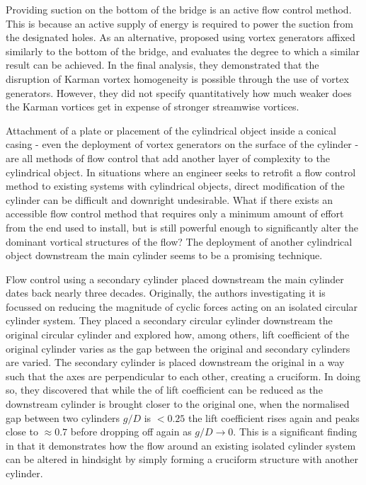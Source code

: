 \documentclass[oneside]{utmthesis}
\begin{document}
Providing suction on the bottom of the bridge is an active flow control method. This is because an active supply of energy is required to power the suction from the designated holes. As an alternative, \citet{Zhang2019} proposed using vortex generators affixed similarly to the bottom of the bridge, and evaluates the degree to which a similar result can be achieved. In the final analysis, they demonstrated that the disruption of Karman vortex homogeneity is possible through the use of vortex generators. However, they did not specify quantitatively how much weaker does the Karman vortices get in expense of stronger streamwise vortices.

Attachment of a plate \citep{Gibeau2019} or placement of the cylindrical object inside a conical casing \citep{Lin2018} - even the deployment of vortex generators on the surface of the cylinder \citep{Zhang2019} - are all methods of flow control that add another layer of complexity to the cylindrical object. In situations where an engineer seeks to retrofit a flow control method to existing systems with cylindrical objects, direct modification of the cylinder can be difficult and downright undesirable. What if there exists an accessible flow control method that requires only a minimum amount of effort from the end used to install, but is still powerful enough to significantly alter the dominant vortical structures of the flow? The deployment of another cylindrical object downstream the main cylinder seems to be a promising technique.

Flow control using a secondary cylinder placed downstream the main cylinder dates back nearly three decades. Originally, the authors investigating it \citep{Shirakashi1989} is focussed on reducing the magnitude of cyclic forces acting on an isolated circular cylinder system. They placed a secondary circular cylinder downstream the original circular cylinder and explored how, among others, \rms{} lift coefficient of the original cylinder varies as the gap between the original and secondary cylinders are varied. The secondary cylinder is placed downstream the original in a way such that the axes are perpendicular to each other, creating a cruciform. In doing so, they discovered that while the \rms{} of lift coefficient can be reduced as the downstream cylinder is brought closer to the original one, when the normalised gap between two cylinders $g/D$ is $< 0.25$ the lift coefficient rises again and peaks close to $\approx 0.7$ before dropping off again as $g/D \to 0$. This is a significant finding in that it demonstrates how the flow around an existing isolated cylinder system can be altered in hindsight by simply forming a cruciform structure with another cylinder.
\end{document}
